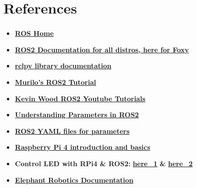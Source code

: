 \documentclass{beamer}
\begin{document}
\section{References}
\begin{frame}{}
    \frametitle{\insertsection}
    \begin{itemize}
        \item \href{https://www.ros.org/}{\textbf{ROS Home}}
        \item \href{https://docs.ros.org/en/foxy/index.html}{\textbf{ROS2 Documentation for all distros, here for Foxy}}
        \item \href{https://docs.ros.org/en/iron/p/rclpy/rclpy.html}{\textbf{rclpy library documentation}}
        \item \href{https://ros2-tutorial.readthedocs.io/\_/downloads/en/latest/pdf/}{\textbf{Murilo's ROS2 Tutorial}}
        \item \href{https://www.youtube.com/watch?v=sWw69pIiMz0&list=PLSK7NtBWwmpTS_YVfjeN3ZzIxItI1P_Sr&index=5}{\textbf{Kevin Wood ROS2 Youtube Tutorials}}
        \item \href{https://docs.ros.org/en/foxy/Tutorials/Beginner-CLI-Tools/Understanding-ROS2-Parameters/Understanding-ROS2-Parameters.html}{\textbf{Understanding Parameters in ROS2}}
        \item \href{https://roboticsbackend.com/ros2-yaml-params/}{\textbf{ROS2 YAML files for parameters}}
        \item \href{https://www.theengineeringprojects.com/2021/03/what-is-raspberry-pi-4-pinout-specs-projects-datasheet.html}{\textbf{Raspberry Pi 4 introduction and basics}}
        \item \textbf{Control LED with RPi4 \& ROS2:} \href{https://medium.com/@alfredgithinji87/blinking-led-with-ros2-microros-and-an-esp32-c5b2cc6bcb12}{\textbf{here\_1}} \textbf{\&} \href{https://medium.com/nerd-for-tech/blink-led-with-raspberry-pi-foolproof-7f2584fd552a}{\textbf{here\_2}}
        \item \href{https://docs.elephantrobotics.com/docs/myarm-pi-300-en/2-serialproduct/2.12-myArm/2.12-myArm.html}{\textbf{Elephant Robotics Documentation}}
    \end{itemize}
\end{frame}
\end{document}
